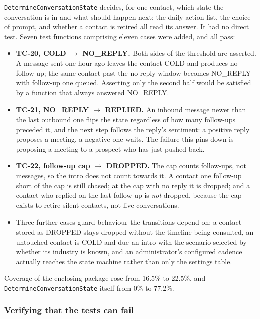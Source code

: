 \documentclass[a4paper]{article}
\begin{document}
\texttt{DetermineConversationState} decides, for one contact, which state the
conversation is in and what should happen next; the daily action list, the
choice of prompt, and whether a contact is retired all read its answer. It had
no direct test. Seven test functions comprising eleven cases were added, and
all pass:

\begin{itemize}
  \item \textbf{TC-20, COLD $\rightarrow$ NO\_REPLY.} Both sides of the
    threshold are asserted. A message sent one hour ago leaves the contact
    COLD and produces no follow-up; the same contact past the no-reply window
    becomes NO\_REPLY with follow-up one queued. Asserting only the second
    half would be satisfied by a function that always answered NO\_REPLY.
  \item \textbf{TC-21, NO\_REPLY $\rightarrow$ REPLIED.} An inbound message
    newer than the last outbound one flips the state regardless of how many
    follow-ups preceded it, and the next step follows the reply's sentiment:
    a positive reply proposes a meeting, a negative one waits. The failure
    this pins down is proposing a meeting to a prospect who has just pushed
    back.
  \item \textbf{TC-22, follow-up cap $\rightarrow$ DROPPED.} The cap counts
    follow-ups, not messages, so the intro does not count towards it. A
    contact one follow-up short of the cap is still chased; at the cap with no
    reply it is dropped; and a contact who replied on the last follow-up is
    \emph{not} dropped, because the cap exists to retire silent contacts, not
    live conversations.
  \item Three further cases guard behaviour the transitions depend on: a
    contact stored as DROPPED stays dropped without the timeline being
    consulted, an untouched contact is COLD and due an intro with the scenario
    selected by whether its industry is known, and an administrator's
    configured cadence actually reaches the state machine rather than only the
    settings table.
\end{itemize}

Coverage of the enclosing package rose from 16.5\% to 22.5\%, and
\texttt{DetermineConversationState} itself from 0\% to 77.2\%.

\subsubsection{Verifying that the tests can fail}
\end{document}
